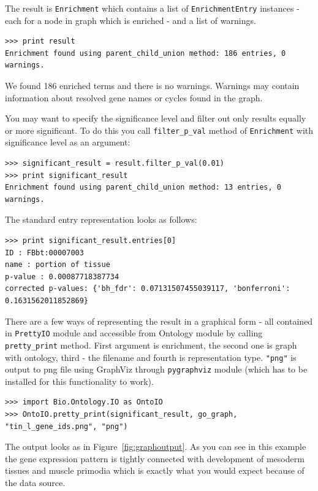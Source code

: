 \documentclass{report}
\begin{document}
The result is \verb|Enrichment| which contains a list of \verb|EnrichmentEntry|
instances - each for a node in graph which is enriched - and a list of warnings.

\begin{verbatim}
>>> print result
Enrichment found using parent_child_union method: 186 entries, 0 warnings.
\end{verbatim}

We found 186 enriched terms and there is no warnings. Warnings may contain
information about resolved gene names or cycles found in the graph.

You may want to specify the significance level and filter out only results
equally or more significant. To do this you call \verb|filter_p_val| method
of \verb|Enrichment| with significance level as an argument:

\begin{verbatim}
>>> significant_result = result.filter_p_val(0.01)
>>> print significant_result
Enrichment found using parent_child_union method: 13 entries, 0 warnings.
\end{verbatim}


The standard entry representation looks as follows:

\begin{verbatim}
>>> print significant_result.entries[0]
ID : FBbt:00007003
name : portion of tissue
p-value : 0.00087718387734
corrected p-values: {'bh_fdr': 0.07131507455039117, 'bonferroni': 0.1631562011852869}
\end{verbatim}

There are a few ways of representing the result in a graphical form - all
contained in \verb|PrettyIO| module and accessible from Ontology module by
calling \verb|pretty_print| method. First argument is enrichment, the
second one is graph with ontology, third - the filename and fourth is
representation type. \verb|"png"| is output to png file using GraphViz through
\verb|pygraphviz| module (which has to be installed for this functionality to
work).

\begin{verbatim}
>>> import Bio.Ontology.IO as OntoIO
>>> OntoIO.pretty_print(significant_result, go_graph, "tin_l_gene_ids.png", "png")
\end{verbatim}

The output looks as in Figure~\ref{fig:graphoutput}. As you can see in this example
the gene expression pattern is tightly connected with development of 
mesoderm tissues and muscle primodia which is exactly what you would expect
because of the data source.
\end{document}
